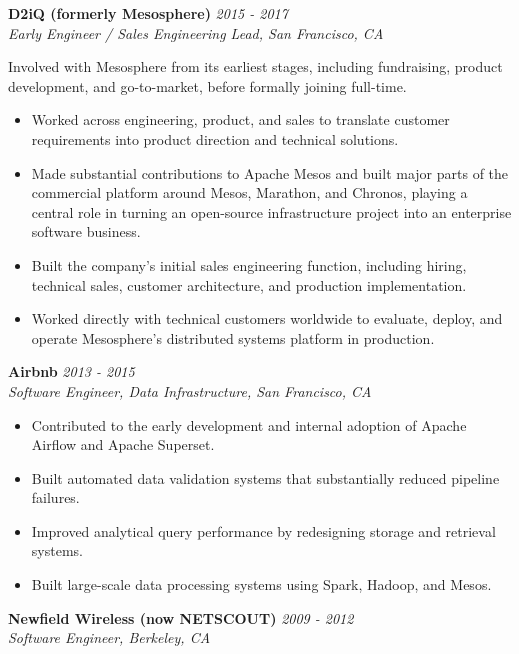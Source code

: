 \documentclass[margin,line]{resume}
\newcommand{\company}[1]{\textbf{#1}}
\newcommand{\jobdates}[1]{\textit{#1}}
\newcommand{\jobtitle}[1]{\textit{#1}}
\begin{document}
\begin{resume}
\filbreak
\company{D2iQ (formerly Mesosphere)} \hfill \jobdates{2015 - 2017}\\
\jobtitle{Early Engineer / Sales Engineering Lead, San Francisco, CA}

Involved with Mesosphere from its earliest stages, including fundraising, product development, and go-to-market, before formally joining full-time.

\begin{itemize}
    \item Worked across engineering, product, and sales to translate customer requirements into product direction and technical solutions.
    \item Made substantial contributions to Apache Mesos and built major parts of the commercial platform around Mesos, Marathon, and Chronos, playing a central role in turning an open-source infrastructure project into an enterprise software business.
    \item Built the company's initial sales engineering function, including hiring, technical sales, customer architecture, and production implementation.
    \item Worked directly with technical customers worldwide to evaluate, deploy, and operate Mesosphere's distributed systems platform in production.
\end{itemize}

\filbreak
\company{Airbnb} \hfill \jobdates{2013 - 2015}\\
\jobtitle{Software Engineer, Data Infrastructure, San Francisco, CA}

\begin{itemize}
    \item Contributed to the early development and internal adoption of Apache Airflow and Apache Superset.
    \item Built automated data validation systems that substantially reduced pipeline failures.
    \item Improved analytical query performance by redesigning storage and retrieval systems.
    \item Built large-scale data processing systems using Spark, Hadoop, and Mesos.
\end{itemize}

\newpage
\vspace*{7pt}

\company{Newfield Wireless (now NETSCOUT)} \hfill \jobdates{2009 - 2012}\\
\jobtitle{Software Engineer, Berkeley, CA}


\end{resume}
\end{document}
